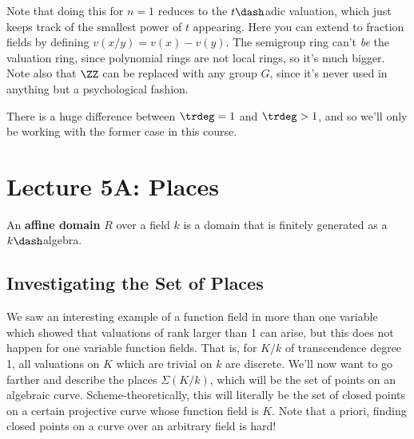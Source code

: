Note that doing this for \(n=1\) reduces to the \(t\dash\)adic
valuation, which just keeps track of the smallest power of \(t\)
appearing. Here you can extend to fraction fields by defining
\(v(x/y) = v(x) - v(y)\). The semigroup ring can't \emph{be} the
valuation ring, since polynomial rings are not local rings, so it's much
bigger. Note also that \(\ZZ\) can be replaced with any group \(G\),
since it's never used in anything but a psychological fashion.

\begin{slogan}

There is a huge difference between \(\trdeg = 1\) and \(\trdeg > 1\),
and so we'll only be working with the former case in this course.

\end{slogan}

\hypertarget{lecture-5a-places}{%
\section{Lecture 5A: Places}\label{lecture-5a-places}}

\begin{definition}

An \textbf{affine domain} \(R\) over a field \(k\) is a domain that is
finitely generated as a \(k\dash\)algebra.

\end{definition}

\hypertarget{investigating-the-set-of-places}{%
\subsection{Investigating the Set of
Places}\label{investigating-the-set-of-places}}

We saw an interesting example of a function field in more than one
variable which showed that valuations of rank larger than 1 can arise,
but this does not happen for one variable function fields. That is, for
\(K/k\) of transcendence degree 1, all valuations on \(K\) which are
trivial on \(k\) are discrete. We'll now want to go farther and describe
the places \(\Sigma(K/k)\), which will be the set of points on an
algebraic curve. Scheme-theoretically, this will literally be the set of
closed points on a certain projective curve whose function field is
\(K\). Note that a priori, finding closed points on a curve over an
arbitrary field is hard!

